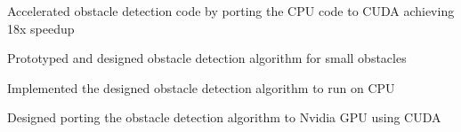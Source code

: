 \documentclass[]{deedy-resume-openfont}
\begin{document}
\begin{minipage}[t]{0.69\textwidth}
\vspace{\topsep} %
\begin{tightemize}
\item Accelerated obstacle detection code by porting the CPU code to CUDA achieving 18x speedup
\end{tightemize}
\sectionsep

\vspace{\topsep} %
\begin{tightemize}
\item Prototyped and designed obstacle detection algorithm for small obstacles
\item Implemented the designed obstacle detection algorithm to run on CPU
\item Designed porting the obstacle detection algorithm to Nvidia GPU using CUDA
\end{tightemize}
\sectionsep


\end{minipage}
\end{document}
